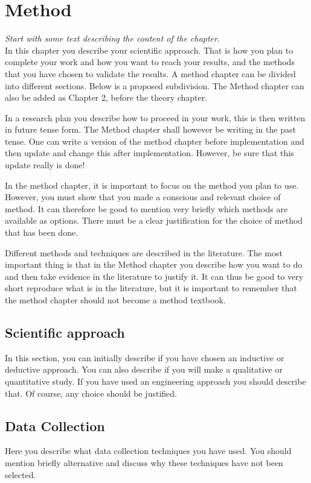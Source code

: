 \chapter{Method}
\emph{Start with some text describing the content of the chapter.}\\

\noindent In this chapter you describe your scientific approach. That is how you plan to complete your work and how you want to reach your results, and the methods that you have chosen to validate the results. A method chapter can be divided into different sections. Below is a proposed subdivision. The Method chapter can also be added as Chapter 2, before the theory chapter.

In a research plan you describe how to proceed in your work, this is then written in future tense form. The Method chapter shall however be writing in the past tense. One can write a version of the method chapter before implementation and then update and change this after implementation. However, be sure that this update really is done!

In the method chapter, it is important to focus on the method you plan to use. However, you must show that you made a conscious and relevant choice of method. It can therefore be good to mention very briefly which methods are available as options. There must be a clear justification for the choice of method that has been done.

Different methods and techniques are described in the literature. The most important thing is that in the Method chapter you describe how you want to do and then take evidence in the literature to justify it. It can thus be good to very short reproduce what is in the literature, but it is important to remember that the method chapter should not become a method textbook.

\section{Scientific approach}
In this section, you can initially describe if you have chosen an inductive or deductive approach. You can also describe if you will make a qualitative or quantitative study. If you have used an engineering approach you should describe that. Of course, any choice should be justified.

\section{Data Collection}
Here you describe what data collection techniques you have used. You should mention briefly alternative and discuss why these techniques have not been selected. 

